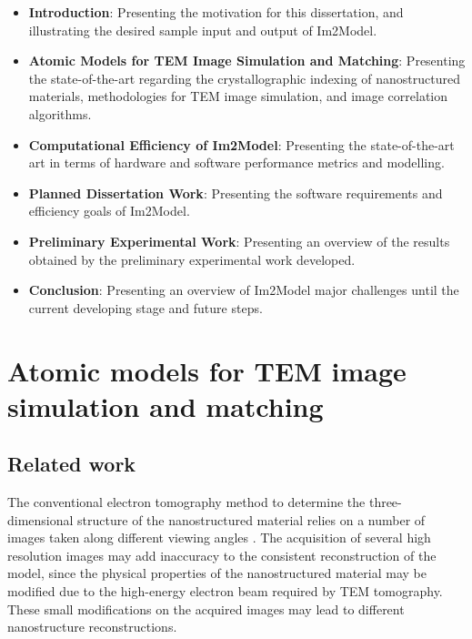 \documentclass[
  oneside,
  11pt, a4paper,
  footinclude=true,
  headinclude=true,
  cleardoublepage=empty
]{scrbook}
\begin{document}
\begin{itemize}
    \item \textbf{Introduction}: Presenting the motivation for this dissertation, and illustrating the desired sample input and output of Im2Model.
    
     \item \textbf{Atomic Models for TEM Image Simulation and Matching}:
    Presenting the state-of-the-art regarding the  crystallographic indexing of nanostructured materials,  methodologies for TEM image simulation, and image correlation algorithms.
        
    \item \textbf{Computational Efficiency of Im2Model}:  Presenting the state-of-the-art art in terms of hardware and
software performance metrics and modelling.

    \item \textbf{Planned Dissertation Work}:
    Presenting the software requirements and efficiency goals of Im2Model.
    
    
        \item \textbf{Preliminary Experimental Work}:  Presenting an overview of the  results obtained by
the preliminary experimental work developed.
            \item \textbf{Conclusion}: Presenting an overview of  Im2Model major challenges until the current developing stage and future steps.


\end{itemize}





	\chapter{Atomic models for TEM image simulation and matching}

	\section{Related work}
	
	The conventional electron tomography method to determine the three-dimensional structure of the nanostructured material relies on a number of images taken along different viewing angles \citep{batenburg20093d}. 
The acquisition of several high resolution images may add inaccuracy to the consistent reconstruction of the model, since the physical properties of the nanostructured material 
may be modified due to the high-energy electron beam required by TEM tomography. These small modifications on the acquired images may lead to different nanostructure reconstructions.\par 
\end{document}
